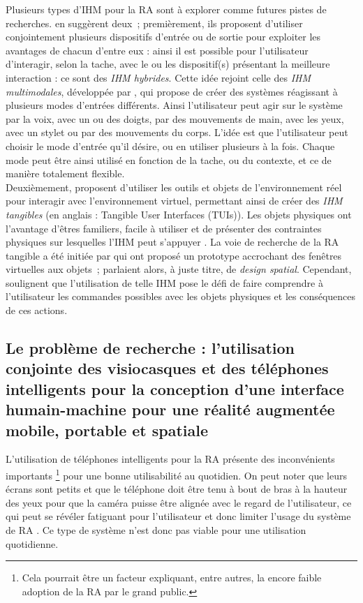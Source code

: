 Plusieurs types d'IHM pour la RA sont à explorer comme futures pistes de recherches. \citet{AzumaBaillotBehringerEtAl2001} en suggèrent deux~; premièrement, ils proposent d'utiliser conjointement plusieurs dispositifs d'entrée ou de sortie pour exploiter les avantages de chacun d'entre eux : ainsi il est possible pour l'utilisateur d'interagir, selon la tache, avec le ou les dispositif(s) présentant la meilleure interaction : ce sont des \emph{IHM hybrides}. \citep{ZhouDuhBillinghurst2008}  Cette idée rejoint celle des \emph{IHM multimodales}, développée par \citet{Oviatt2003}, qui propose de créer des systèmes réagissant à plusieurs modes d'entrées différents. Ainsi l'utilisateur peut agir sur le système par la voix, avec un ou des doigts, par des mouvements de main, avec les yeux, avec un stylet ou par des mouvements du corps. L'idée est que l'utilisateur peut choisir le mode d'entrée qu'il désire, ou en utiliser plusieurs à la fois. Chaque mode peut être ainsi utilisé en fonction de la tache, ou du contexte, et ce de manière totalement flexible. \citep{CarmignianiFurhtAnisettiEtAl2011}\\
Deuxièmement, \citet{AzumaBaillotBehringerEtAl2001} proposent d'utiliser les outils et objets de l'environnement réel pour interagir avec l'environnement virtuel, permettant ainsi de créer des \emph{IHM tangibles} (en anglais : \foreignlanguage{english}{Tangible User Interfaces (TUIs)}). Les objets physiques ont l'avantage d'êtres familiers, facile à utiliser et de présenter des contraintes physiques sur lesquelles l'IHM peut s'appuyer \citep{ZhouDuhBillinghurst2008}. La voie de recherche de la RA tangible a été initiée par \citet{FeinerMacIntyreHauptEtAl1993} qui ont proposé un prototype accrochant des fenêtres virtuelles aux objets~; \citeauthor{FeinerMacIntyreHauptEtAl1993} parlaient alors, à juste titre, de \emph{design spatial}. Cependant, \citeauthor{ZhouDuhBillinghurst2008} soulignent que l'utilisation de telle IHM pose le défi de faire comprendre à l'utilisateur les commandes possibles avec les objets physiques et les conséquences de ces actions.


\subsection{Le problème de recherche : l'utilisation conjointe des visiocasques et des téléphones intelligents pour la conception d'une interface humain-machine pour une réalité augmentée mobile, portable et spatiale}
L'utilisation de téléphones intelligents pour la RA présente des inconvénients importants \footnote{Cela pourrait être un facteur expliquant, entre autres, la encore faible adoption de la RA par le grand public.} pour une bonne utilisabilité au quotidien. On peut noter que leurs écrans sont petits \citep{DeSaChurchill2013} et que le téléphone doit être tenu à bout de bras à la hauteur des yeux pour que la caméra puisse être alignée avec le regard de l'utilisateur, ce qui peut se révéler fatiguant pour l'utilisateur et donc limiter l'usage du système de RA \citep{Hincapie-RamosGuoMoghadasianEtAl2014}. Ce type de système n'est donc pas viable pour une utilisation quotidienne.

